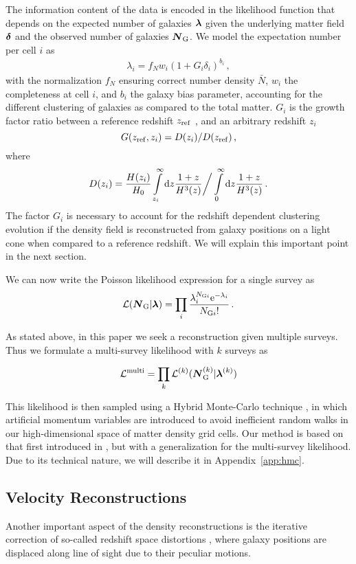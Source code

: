 \documentclass[twocolumn]{aastex63}
\newcommand{\mbi}[1]{\hbox{\boldmath{$#1$}}}
\newcommand{\be}{\begin{equation}}
\newcommand{\ee}{\end{equation}}
\newcommand{\ba}{\begin{eqnarray}}
\newcommand{\ea}{\end{eqnarray}}
\begin{document}
\begin{CJK*}{UTF8}{gbsn}
The information content of the data is encoded in the likelihood function that depends on the expected number of galaxies $\mbi \lambda$ given the underlying matter field $\mbi \delta$ and the observed number of galaxies $\mbi{N}_{\rm G}$.
We model the expectation number per cell $i$ as
\ba
\label{eq:expect}
\lambda_{i}=f_{N}w_{i}(1+G_i\delta_{i})^{b_i}\,,
\ea
with the normalization $f_{N}$ ensuring correct number density $\bar{N}$, $w_i$ the completeness at cell $i$, and  $b_i$ the galaxy bias parameter, accounting for the different clustering of galaxies as compared to the total matter. $G_i$ is the growth factor ratio between a reference redshift $z_{\rm ref}$ , and an arbitrary redshift $z_i$
\be
G(z_{\rm ref},z_i) = D(z_i)/D(z_{\rm ref})\, ,
\ee
where 
\be
D(z_i) = \frac{H(z_i)}{H_0} \int\limits_{z_i}^\infty{\rm d}z\frac{1+z}{H^3(z)} \bigg/ \int\limits_{0}^\infty{\rm d}z\frac{1+z}{H^3(z)} \, .
\ee
The factor $G_i$ is necessary to account for the redshift dependent clustering evolution if the density field is reconstructed from galaxy positions on a light cone \citep{ata:2017} when compared to a reference redshift. We will explain this important point in the next section.

We can now write the Poisson likelihood expression for a single survey as
\ba
\label{likelihood}
\mathcal{L} (\mbi{N}_{{\rm G}} \vert\mbi\lambda)=\prod_{i}\frac{\lambda_{i}^{{N}_{{\rm G}i}}{\rm e}^{-\lambda_{i}}}{{N}_{{\rm G}i}!}\,.
\ea

As stated above, in this paper we seek a reconstruction given multiple surveys. Thus we formulate a multi-survey likelihood with $k$ surveys as

\be
\label{multilikelihood}
\mathcal{L}^{\rm multi} = \prod_k \mathcal{L}^{(k)} (\mbi {N}^{(k)}_{\rm G}\vert\mbi {\lambda}^{(k)} )
\ee

This likelihood is then sampled using a Hybrid Monte-Carlo technique \citep[HMC,][]{duane:1987,neal:2011}, in which 
artificial momentum variables are introduced to avoid inefficient random walks in our high-dimensional space of matter density grid cells.
Our method is based on that first introduced in \citet{ata:2015}, but with a generalization for the multi-survey likelihood. 
Due to its technical nature, we will describe it in Appendix~\ref{app:hmc}.



\subsection{Velocity Reconstructions}
Another important aspect of the density reconstructions is the iterative correction of so-called redshift space distortions \citep{kaiser:1987,hamilton:1997}, where galaxy positions are displaced along line of sight due to their peculiar motions.


\end{CJK*}
\end{document}
